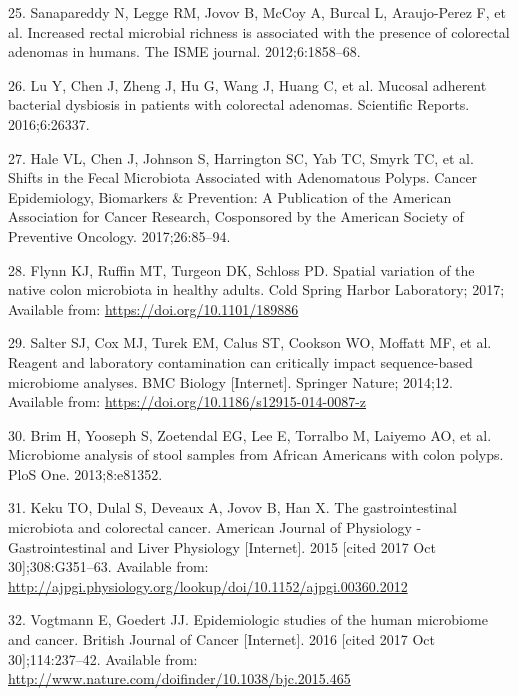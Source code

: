 \documentclass[12pt,]{article}
\begin{document}
\hypertarget{ref-sanapareddy_increased_2012}{}
25. Sanapareddy N, Legge RM, Jovov B, McCoy A, Burcal L, Araujo-Perez F,
et al. Increased rectal microbial richness is associated with the
presence of colorectal adenomas in humans. The ISME journal.
2012;6:1858--68.

\hypertarget{ref-lu_mucosal_2016}{}
26. Lu Y, Chen J, Zheng J, Hu G, Wang J, Huang C, et al. Mucosal
adherent bacterial dysbiosis in patients with colorectal adenomas.
Scientific Reports. 2016;6:26337.

\hypertarget{ref-hale_shifts_2017}{}
27. Hale VL, Chen J, Johnson S, Harrington SC, Yab TC, Smyrk TC, et al.
Shifts in the Fecal Microbiota Associated with Adenomatous Polyps.
Cancer Epidemiology, Biomarkers \& Prevention: A Publication of the
American Association for Cancer Research, Cosponsored by the American
Society of Preventive Oncology. 2017;26:85--94.

\hypertarget{ref-Flynn_preprint_2017}{}
28. Flynn KJ, Ruffin MT, Turgeon DK, Schloss PD. Spatial variation of
the native colon microbiota in healthy adults. Cold Spring Harbor
Laboratory; 2017; Available from: \url{https://doi.org/10.1101/189886}

\hypertarget{ref-Salter_contamination_2014}{}
29. Salter SJ, Cox MJ, Turek EM, Calus ST, Cookson WO, Moffatt MF, et
al. Reagent and laboratory contamination can critically impact
sequence-based microbiome analyses. BMC Biology {[}Internet{]}. Springer
Nature; 2014;12. Available from:
\url{https://doi.org/10.1186/s12915-014-0087-z}

\hypertarget{ref-brim_microbiome_2013}{}
30. Brim H, Yooseph S, Zoetendal EG, Lee E, Torralbo M, Laiyemo AO, et
al. Microbiome analysis of stool samples from African Americans with
colon polyps. PloS One. 2013;8:e81352.

\hypertarget{ref-keku_gastrointestinal_2015}{}
31. Keku TO, Dulal S, Deveaux A, Jovov B, Han X. The gastrointestinal
microbiota and colorectal cancer. American Journal of Physiology -
Gastrointestinal and Liver Physiology {[}Internet{]}. 2015 {[}cited 2017
Oct 30{]};308:G351--63. Available from:
\url{http://ajpgi.physiology.org/lookup/doi/10.1152/ajpgi.00360.2012}

\hypertarget{ref-vogtmann_epidemiologic_2016}{}
32. Vogtmann E, Goedert JJ. Epidemiologic studies of the human
microbiome and cancer. British Journal of Cancer {[}Internet{]}. 2016
{[}cited 2017 Oct 30{]};114:237--42. Available from:
\url{http://www.nature.com/doifinder/10.1038/bjc.2015.465}
\end{document}
